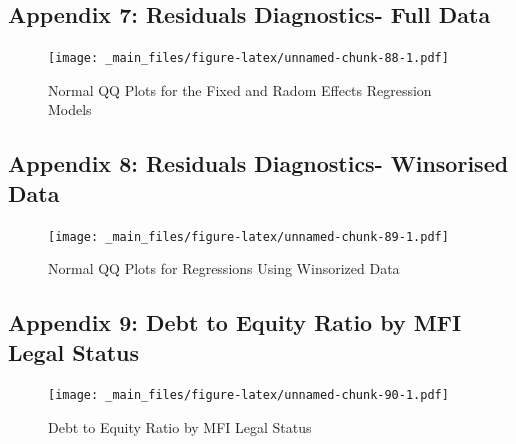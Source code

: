 \documentclass[a4paper, nobind]{templates/ociamthesis}
\begin{document}
\begin{landscape}

\newpage

\hypertarget{appendix-7-residuals-diagnostics--full-data}{%
\subsection{Appendix 7: Residuals Diagnostics- Full Data}\label{appendix-7-residuals-diagnostics--full-data}}

\begin{figure}
\centering
\texttt{[image: \_main\_files/figure-latex/unnamed-chunk-88-1.pdf]}
\caption{\label{fig:unnamed-chunk-88}Normal QQ Plots for the Fixed and Radom Effects Regression Models}
\end{figure}

\end{landscape}

\begin{landscape}

\newpage

\hypertarget{appendix-8-residuals-diagnostics--winsorised-data}{%
\subsection{Appendix 8: Residuals Diagnostics- Winsorised Data}\label{appendix-8-residuals-diagnostics--winsorised-data}}

\begin{figure}
\centering
\texttt{[image: \_main\_files/figure-latex/unnamed-chunk-89-1.pdf]}
\caption{\label{fig:unnamed-chunk-89}Normal QQ Plots for Regressions Using Winsorized Data}
\end{figure}

\end{landscape}

\begin{landscape}

\newpage

\hypertarget{appendix-9-debt-to-equity-ratio-by-mfi-legal-status}{%
\subsection{Appendix 9: Debt to Equity Ratio by MFI Legal Status}\label{appendix-9-debt-to-equity-ratio-by-mfi-legal-status}}

\begin{figure}
\centering
\texttt{[image: \_main\_files/figure-latex/unnamed-chunk-90-1.pdf]}
\caption{\label{fig:unnamed-chunk-90}Debt to Equity Ratio by MFI Legal Status}
\end{figure}

\end{landscape}
\end{document}
